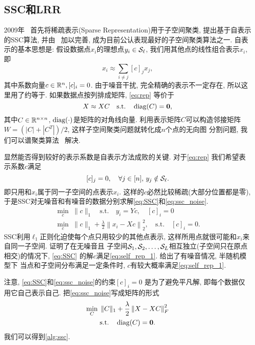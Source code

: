 \subsection{SSC和LRR}
2009年~\cite{elhamifar2009sparse} 首先将稀疏表示(Sparse Representation)用于子空间聚类, 
提出基于自表示的SSC算法,
并由~\cite{elhamifar2013sparse} 加以完善, 成为目前公认表现最好的子空间聚类算法之一.
自表示的基本思想是: 假设数据点\(x_i\)的理想点\(y_i \in \mathcal{S}_\ell\), 
我们用其他点的线性组合表示\(x_i\), 即
\begin{equation}
  x_i \approx \sum_{i\neq j} [c]_j x_j, 
  \label{eq:rep}
\end{equation}
其中系数向量\(c\in \mathbb{R}^n, [c]_i = 0\). 
由于噪音干扰, 完全精确的表示不一定存在, 所以这里用了约等于.
如果数据点按列排成矩阵, \eqref{eq:rep} 等价于
\begin{equation}
  X \approx XC \quad \text{s.t.}\quad \operatorname{diag}(C) = \mathbf{0},
  \label{eq:matrix_rep}
\end{equation}
其中\(C\in \mathbb{R}^{n\times n}\), \(\operatorname{diag}(\cdot)\)是矩阵的对角线向量.
利用表示矩阵\(C\)可以构造邻接矩阵\(W=(|C|+|C^T|)/2\),
这样子空间聚类问题就转化成\(n\)个点的无向图
分割问题, 我们可以谱聚类算法~\cite{ng2002spectral} 解决.

显然能否得到较好的表示系数是自表示方法成败的关键.
对于\eqref{eq:rep} 我们希望表示系数\(c\)满足
\begin{equation}\label{eq:self_rep_1}
  [c]_j = 0, \quad  \forall j\in [n], \,y_j \notin \mathcal{S}_\ell .
\end{equation}
即只用和\(x_i\)属于同一子空间的点表示\(x_i\).
这样的\(c\)必然比较稀疏(大部分位置都是零), 
于是SSC对无噪音和有噪音的数据分别求解\eqref{eq:SSC}和\eqref{eq:ssc_noise}.
\begin{gather}
  \min_{c} \; \|c\|_1\quad \text{s.t.}\quad y_i=Yc, \quad [c]_i=0 \label{eq:SSC}\\
  \min_{c} \; \|c\|_1+\frac{\lambda}{2}\left\|x_i-Xc\right\|_2^2, \quad \text{s.t.} \quad
  [c]_i = 0. \label{eq:ssc_noise}
\end{gather}
SSC利用\(\ell_1\)正则化迫使每个点只用较少的其他点表示,
这样所用点就很可能和\(x_i\)来自同一子空间.
\cite{elhamifar2013sparse} 证明了在无噪音且
子空间\(\mathcal{S}_1, \mathcal{S}_2, \ldots, \mathcal{S}_L\)相互独立(子空间只在原点相交)的情况下,
\eqref{eq:SSC} 的解\(c\)满足\eqref{eq:self_rep_1}.
\cite{soltanolkotabi2014robust} 给出了有噪音情况, 半随机模型下
当点和子空间分布满足一定条件时, \(c\)有较大概率满足\eqref{eq:self_rep_1}.

注意, \eqref{eq:SSC}和\eqref{eq:ssc_noise}的约束\([c]_i = 0\) 是为了避免平凡解,
即每个数据仅用它自己表示自己. 把\eqref{eq:ssc_noise}写成矩阵的形式
\begin{equation}
  \begin{gathered}
    \min_C \; \|C\|_1+\frac{\lambda}{2}\left\|X-XC\right\|_F^2\\
    \text{s.t.} \quad \operatorname{diag}(C)=\mathbf{0}.
  \end{gathered}
  \label{eq:ssc_matrix}
\end{equation}
我们可以得到\autoref{alg:ssc}.

